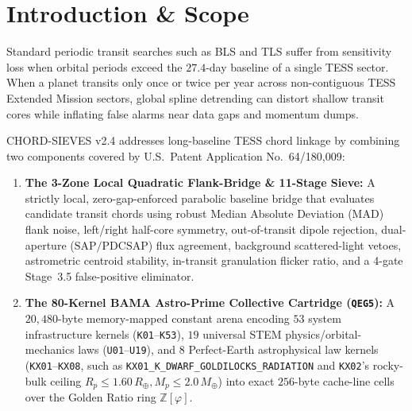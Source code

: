 \documentclass[10pt,twocolumn]{article}
\begin{document}
\begin{abstract}
$T_{\text{surf}} = +22.1^\circ\text{C} / +71.8^\circ\text{F}$, score $93.9\%$). In longitudinal forward-prediction auditing across \textbf{4,957 scheduled transit windows} (\textbf{Self-Audit Ledger v2.4.0}), CHORD-SIEVES achieved \textbf{2,170 / 4,957 (43.78\%) on-time \texttt{CORRECT}} transit recoveries and \textbf{422 (8.51\%) \texttt{SHIFTED (TTV)}} drift recoveries across $429$ recalibrated records, with \textbf{0 \texttt{WRONG}} across the $2{,}592$ observationally covered windows ($100.0\%$ covered-window non-retraction rate across $843$ multi-sector records), $2{,}326$ windows in sector gaps (\texttt{UNABLE TO VERIFY}), and $39$ awaiting MAST release (\texttt{PENDING\_DATA\_RELEASE}).
\end{abstract}

\section{Introduction \& Scope}
Standard periodic transit searches such as BLS and TLS suffer from sensitivity loss when orbital periods exceed the $27.4$-day baseline of a single TESS sector. When a planet transits only once or twice per year across non-contiguous TESS Extended Mission sectors, global spline detrending can distort shallow transit cores while inflating false alarms near data gaps and momentum dumps.

CHORD-SIEVES v2.4 addresses long-baseline TESS chord linkage by combining two components covered by U.S.\ Patent Application No.\ 64/180,009:
\begin{enumerate}
  \item \textbf{The 3-Zone Local Quadratic Flank-Bridge \& 11-Stage Sieve:} A strictly local, zero-gap-enforced parabolic baseline bridge that evaluates candidate transit chords using robust Median Absolute Deviation (MAD) flank noise, left/right half-core symmetry, out-of-transit dipole rejection, dual-aperture ($\text{SAP}/\text{PDCSAP}$) flux agreement, background scattered-light vetoes, astrometric centroid stability, in-transit granulation flicker ratio, and a 4-gate Stage~3.5 false-positive eliminator.
  \item \textbf{The 80-Kernel BAMA Astro-Prime Collective Cartridge (\texttt{QEG5}):} A $20{,}480$-byte memory-mapped constant arena encoding $53$ system infrastructure kernels (\texttt{K01}--\texttt{K53}), $19$ universal STEM physics/orbital-mechanics laws (\texttt{U01}--\texttt{U19}), and $8$ Perfect-Earth astrophysical law kernels (\texttt{KX01}--\texttt{KX08}, such as \texttt{KX01\_K\_DWARF\_GOLDILOCKS\_RADIATION} and \texttt{KX02}'s rocky-bulk ceiling $R_p \le 1.60\,R_\oplus, M_p \le 2.0\,M_\oplus$) into exact $256$-byte cache-line cells over the Golden Ratio ring $\mathbb{Z}[\varphi]$.
\end{enumerate}
\end{document}
